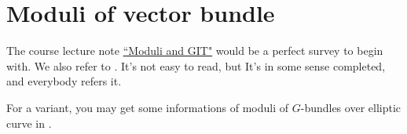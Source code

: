 \section{Moduli of vector bundle}
The course lecture note \href{https://userpage.fu-berlin.de/hoskins/moduli_and_GIT.html}{``Moduli and GIT"} would be a perfect survey to begin with. We also refer to \cite{huybrechts2010geometry}. It's not easy to read, but It's in some sense completed, and everybody refers it.

For a variant, you may get some informations of moduli of $G$-bundles over elliptic curve in \cite{frăţilă2020revisiting}.